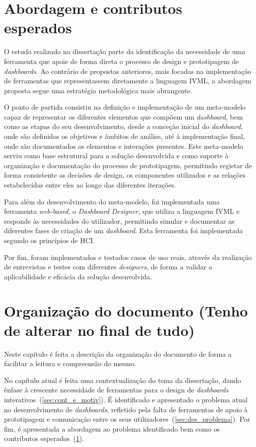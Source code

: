 \section{Abordagem e contributos esperados}
\label{sec:contribuicoes}

O estudo realizado na dissertação parte da identificação da necessidade de uma ferramenta que apoie de forma direta o processo de design e prototipagem de \textit{dashboards}. Ao contrário de propostas anteriores, mais focadas na implementação de ferramentas que representassem diretamente a linguagem \gls{IVML}, a abordagem proposta segue uma estratégia metodológica mais abrangente.

O ponto de partida consistiu na definição e implementação de um meta-modelo capaz de representar os diferentes elementos que compõem um \textit{dashboard}, bem como as etapas do seu desenvolvimento, desde a conceção inicial do \textit{dashboard}, onde são definidos os objetivos e âmbitos de análise, até à implementação final, onde são documentados os elementos e interações presentes. Este meta-modelo serviu como base estrutural para a solução desenvolvida e como suporte à organização e documentação do processo de prototipagem, permitindo registar de forma consistente as decisões de design, os componentes utilizados e as relações estabelecidas entre eles ao longo das diferentes iterações.

Para além do desenvolvimento do meta-modelo, foi implementada uma ferramenta \textit{web-based}, o \textit{Dashboard Designer}, que utiliza a linguagem \gls{IVML} e responde às necessidades do utilizador, permitindo simular e documentar as diferentes fases de criação de um \textit{dashboard}. Esta ferramenta foi implementada segundo os princípios de \gls{HCI}.

Por fim, foram implementados e testados casos de uso reais, através da realização de entrevistas e testes com diferentes \textit{designers}, de forma a validar a aplicabilidade e eficácia da solução desenvolvida.

\section{Organização do documento (Tenho de alterar no final de tudo)}
\label{sec:organizacao}

Neste capítulo é feita a descrição da organização do documento de forma a facilitar a leitura e compreensão do mesmo. 

No capítulo atual é feita uma contextualização do tema da dissertação, dando ênfase à crescente necessidade de ferramentas para o design de \textit{dashboards} interativos~(\ref{sec:cont_e_motiv}). É identificado e apresentado o problema atual no desenvolvimento de \textit{dashboards}, refletido pela falta de ferramentas de apoio à prototipagem e comunicação entre os seus utilizadores~(\ref{sec:des_problema}). Por fim, é apresentada a abordagem ao problema identificado bem como os contributos esperados~(\ref{sec:contribuicoes}).

